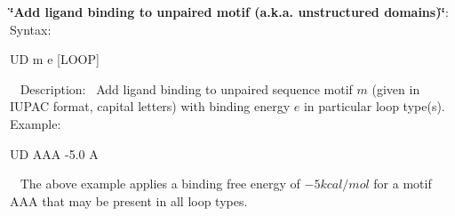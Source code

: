\begin{DoxyEnumerate}
\item {\bfseries \char`\"{}\+Add ligand binding to unpaired motif (a.\+k.\+a. unstructured domains)\char`\"{}}\+:~\newline
 Syntax\+:
\begin{DoxyCode}
UD m e [LOOP] 
\end{DoxyCode}
~\newline
 Description\+:~\newline
 Add ligand binding to unpaired sequence motif $ m $ (given in I\+U\+P\+AC format, capital letters) with binding energy $ e $ in particular loop type(s).~\newline
 Example\+: 
\begin{DoxyCode}
UD  AAA   -5.0    A
\end{DoxyCode}
~\newline
 The above example applies a binding free energy of $ -5 kcal/mol $ for a motif A\+AA that may be present in all loop types. 
\end{DoxyEnumerate}